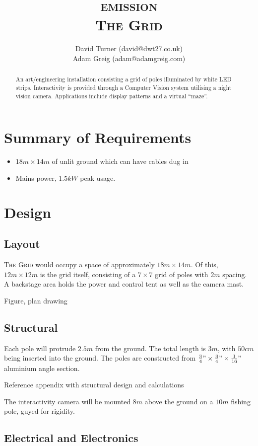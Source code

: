 \documentclass[12pt]{article} %
\title {\textsc{emission}\\\large{\textsc{The Grid}}}
\author{David Turner (david@dwt27.co.uk)\\Adam Greig (adam@adamgreig.com)}
\begin{document}
    \maketitle

\begin{abstract}
An art/engineering installation consisting a grid of poles illuminated by white LED strips.  Interactivity is provided through a Computer Vision system utilising a night vision camera.  Applications include display patterns and a virtual ``maze''.
\end{abstract}

\section{Summary of Requirements}
\begin{itemize}
    \item $18m \times 14m$ of unlit ground which can have cables dug in
    \item Mains power, $1.5kW$ peak usage.
\end{itemize}

\section{Design}
\subsection{Layout}
\textsc{The Grid} would occupy a space of approximately $18m \times 14m$.  Of this, $12m \times 12m$ is the grid itself, consisting of a $7 \times 7$ grid of poles with $2m$ spacing.  A backstage area holds the power and control tent as well as the camera mast.

Figure, plan drawing

\subsection{Structural}
Each pole will protrude $2.5m$ from the ground.  The total length is $3m$, with $50cm$ being inserted into the ground.  The poles are constructed from $\frac{3}{4}" \times \frac{3}{4}" \times \frac{1}{16}"$ aluminium angle section.

Reference appendix with structural design and calculations

The interactivity camera will be mounted $8m$ above the ground on a $10m$ fishing pole, guyed for rigidity.

\subsection{Electrical and Electronics}
\end{document}
